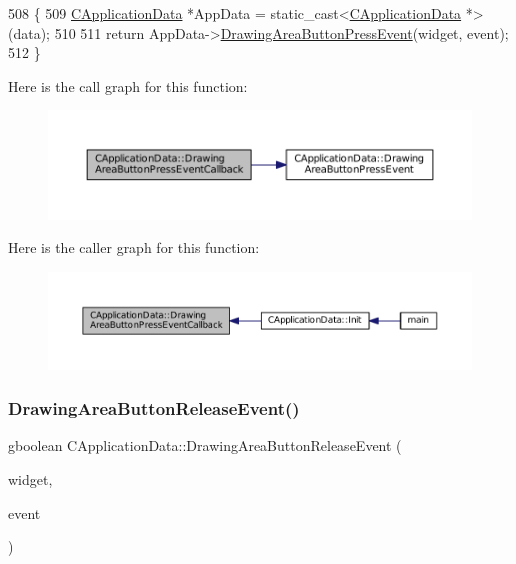 \begin{DoxyCode}
508                                                                                                            
                \{
509     \hyperlink{classCApplicationData}{CApplicationData} *AppData = \textcolor{keyword}{static\_cast<}\hyperlink{classCApplicationData}{CApplicationData} *\textcolor{keyword}{>}(data);
510 
511     \textcolor{keywordflow}{return} AppData->\hyperlink{classCApplicationData_ae7516e29f629998e4068ae1584d0237c}{DrawingAreaButtonPressEvent}(widget, event);
512 \}
\end{DoxyCode}
Here is the call graph for this function\+:\nopagebreak
\begin{figure}[H]
\begin{center}
\leavevmode
\includegraphics[width=350pt]{classCApplicationData_aaa867e992733fa1e88e67c026c8a2947_cgraph}
\end{center}
\end{figure}
Here is the caller graph for this function\+:\nopagebreak
\begin{figure}[H]
\begin{center}
\leavevmode
\includegraphics[width=350pt]{classCApplicationData_aaa867e992733fa1e88e67c026c8a2947_icgraph}
\end{center}
\end{figure}
\hypertarget{classCApplicationData_a7df4d71ef6fabf7eac740c95cfe3cd81}{}\label{classCApplicationData_a7df4d71ef6fabf7eac740c95cfe3cd81} 
\subsubsection{\texorpdfstring{Drawing\+Area\+Button\+Release\+Event()}{DrawingAreaButtonReleaseEvent()}}
{\footnotesize\ttfamily gboolean C\+Application\+Data\+::\+Drawing\+Area\+Button\+Release\+Event (\begin{DoxyParamCaption}\item[{Gtk\+Widget $\ast$}]{widget,  }\item[{Gdk\+Event\+Button $\ast$}]{event }\end{DoxyParamCaption})\hspace{0.3cm}{\ttfamily [protected]}}



